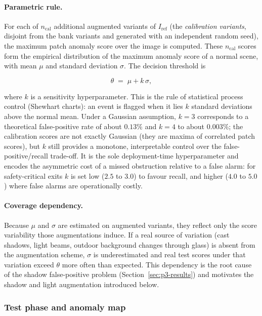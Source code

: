 \paragraph{Parametric rule.} For each of $n_{\mathrm{cal}}$ additional augmented
variants of $I_{\mathrm{ref}}$ (the \emph{calibration variants}, disjoint from the
bank variants and generated with an independent random seed), the maximum patch
anomaly score over the image is computed. These $n_{\mathrm{cal}}$ scores form the
empirical distribution of the maximum anomaly score of a normal scene, with mean
$\mu$ and standard deviation $\sigma$. The decision threshold is

\begin{equation}
  \theta \;=\; \mu + k\,\sigma ,
  \label{eq:threshold}
\end{equation}

where $k$ is a sensitivity hyperparameter. This is the rule of statistical
process control (Shewhart charts): an event is flagged when it lies $k$ standard
deviations above the normal mean. Under a Gaussian assumption, $k=3$ corresponds
to a theoretical false-positive rate of about $0.13\%$ and $k=4$ to about
$0.003\%$; the calibration scores are not exactly Gaussian (they are maxima of
correlated patch scores), but $k$ still provides a monotone, interpretable
control over the false-positive/recall trade-off. It is the sole
deployment-time hyperparameter and encodes the asymmetric cost of a missed
obstruction relative to a false alarm: for safety-critical exits $k$ is set low
($2.5$ to $3.0$) to favour recall, and higher ($4.0$ to $5.0$) where false
alarms are operationally costly.

\paragraph{Coverage dependency.} Because $\mu$ and $\sigma$ are estimated on
augmented variants, they reflect only the score variability those augmentations
induce. If a real source of variation (cast shadows, light beams, outdoor
background changes through glass) is absent from the augmentation scheme,
$\sigma$ is underestimated and real test scores under that variation exceed
$\theta$ more often than expected. This dependency is the root cause of the
shadow false-positive problem (Section~\ref{sec:p3-results}) and motivates the
shadow and light augmentation introduced below.

\subsubsection{Test phase and anomaly map}


